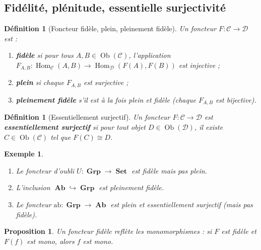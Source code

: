 \documentclass[a4paper,12pt]{book}
\DeclareMathOperator{\Hom}{Hom}
\DeclareMathOperator{\Ob}{Ob}
\DeclareMathOperator{\Set}{\mathbf{Set}}
\DeclareMathOperator{\Grp}{\mathbf{Grp}}
\DeclareMathOperator{\Ab}{\mathbf{Ab}}
\newtheorem{proposition}[theoreme]{Proposition}
\newtheorem{definition}[theoreme]{Définition}
\newtheorem{exemple}[theoreme]{Exemple}
\begin{document}
\subsection{Fidélité, plénitude, essentielle surjectivité}

\begin{definition}[Foncteur fidèle, plein, pleinement fidèle]\label{def:fidele-plein}
Un foncteur $F : \mathcal{C} \to \mathcal{D}$ est :
\begin{enumerate}[label=(\roman*)]
  \item \textbf{fidèle} si pour tous $A, B \in \Ob(\mathcal{C})$, l'application $F_{A,B} : \Hom_\mathcal{C}(A,B) \to \Hom_\mathcal{D}(F(A), F(B))$ est injective ;
  \item \textbf{plein} si chaque $F_{A,B}$ est surjective ;
  \item \textbf{pleinement fidèle} s'il est à la fois plein et fidèle (chaque $F_{A,B}$ est bijective).
\end{enumerate}
\end{definition}

\begin{definition}[Essentiellement surjectif]\label{def:ess-surj}
Un foncteur $F : \mathcal{C} \to \mathcal{D}$ est \textbf{essentiellement surjectif} si pour tout objet $D \in \Ob(\mathcal{D})$, il existe $C \in \Ob(\mathcal{C})$ tel que $F(C) \cong D$.
\end{definition}

\begin{exemple}\label{ex:foncteur-fidele}
\begin{enumerate}[label=(\alph*)]
  \item Le foncteur d'oubli $U : \Grp \to \Set$ est fidèle mais pas plein.
  \item L'inclusion $\Ab \hookrightarrow \Grp$ est pleinement fidèle.
  \item Le foncteur $\mathrm{ab} : \Grp \to \Ab$ est plein et essentiellement surjectif (mais pas fidèle).
\end{enumerate}
\end{exemple}

\begin{proposition}\label{prop:plein-fidele-mono}
Un foncteur fidèle reflète les monomorphismes : si $F$ est fidèle et $F(f)$ est mono, alors $f$ est mono.
\end{proposition}
\end{document}
